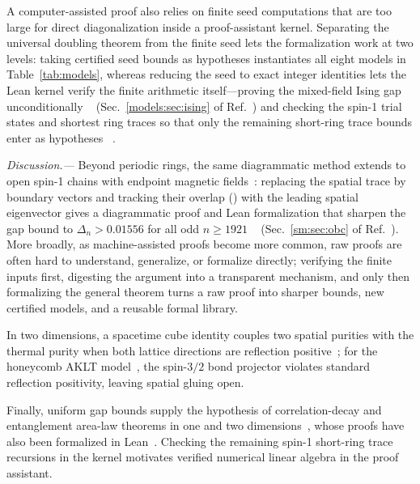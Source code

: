 A computer-assisted proof also relies on finite seed computations that
are too large for direct diagonalization inside a proof-assistant
kernel. Separating the universal doubling theorem from the finite seed
lets the formalization work at two levels: taking certified seed bounds
as hypotheses instantiates all eight models in Table~\ref{tab:models},
whereas reducing the seed to exact integer identities lets the Lean
kernel verify the finite arithmetic itself—proving the mixed-field
Ising gap unconditionally%
~
(Sec.~\ref{models:sec:ising} of Ref.~\cite{SM}) and checking the
spin-1 trial states and shortest ring traces so that only the
remaining short-ring trace bounds enter as hypotheses%
~.

\emph{Discussion.---}
Beyond periodic rings, the same diagrammatic method extends to open
spin-1 chains with endpoint magnetic
fields~\cite{OpenAI2026Boundaryfield}: replacing the spatial trace by
boundary vectors and tracking their overlap (\overlapglyph) with the
leading spatial eigenvector gives a diagrammatic proof and Lean
formalization that sharpen the gap bound to $\Delta_n>0.01556$ for all
odd $n\ge1921$%
~
(Sec.~\ref{sm:sec:obc} of Ref.~\cite{SM}). More broadly, as
machine-assisted proofs become more common, raw proofs are often hard
to understand, generalize, or formalize directly; verifying the finite
inputs first, digesting the argument into a transparent mechanism, and
only then formalizing the general theorem turns a raw proof into
sharper bounds, new certified models, and a reusable formal library.

In two dimensions, a spacetime cube identity couples two spatial
purities with the thermal purity when both lattice directions are
reflection positive~\cite{Lu2026CertifiedGaps}; for the honeycomb AKLT
model~\cite{Affleck1987Rigorous,Lemm2020Existence,Pomata2020Demonstrating},
the spin-$3/2$ bond projector violates standard reflection positivity,
leaving spatial gluing open.

Finally, uniform gap bounds supply the hypothesis of correlation-decay
and entanglement area-law theorems in one and two
dimensions~\cite{Hastings2006Spectral,Hastings2007Area,Arad2013Area,OpenAI2026Twodimensional,OpenAI2026Polynomial},
whose proofs have also been formalized in
Lean~\cite{Lu2026Multiagent,Lu2026TNLean}. Checking the remaining
spin-1 short-ring trace recursions in the kernel motivates verified
numerical linear algebra in the proof assistant.
